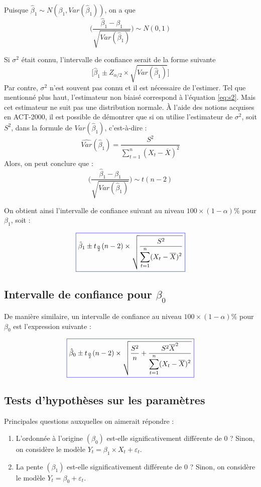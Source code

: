 \documentclass[11pt,french]{report}
\begin{document}
\bigskip
Puisque $ \hat{\beta}_1 \sim N(\beta_1, Var(\hat{\beta}_1))$, on a que 
$$
\Bigg(\frac{\hat{\beta}_1 - \beta_1}{\sqrt{Var(\hat{\beta}_1)}}\Bigg) \sim N(0,1)
$$

Si $\sigma^2$ était connu, l'intervalle de confiance serait de la forme suivante 
$$
\bigg[\hat{\beta}_1\pm Z_{\alpha/2} \times \sqrt{Var(\hat{\beta}_1)}\bigg]
$$
Par contre, $\sigma^2$ n'est  souvent pas connu et il est nécessaire de l'estimer. Tel que mentionné plus haut, l'estimateur non biaisé correspond à l'équation \ref{eq:s2}. Mais cet estimateur ne suit pas une distribution normale. À l'aide des notions acquises en ACT-2000, il est possible de démontrer que si on utilise l'estimateur de $\sigma^2$, soit $S^2$, dans la formule de $Var(\hat{\beta}_1)$, c'est-à-dire :
$$
\widehat{Var}(\hat{\beta}_1) = \frac{S^2}{\displaystyle\sum_{t=1}^n (X_t - \overline{X})^2}
$$
Alors, on peut conclure que :
$$
\Bigg(\frac{\hat{\beta}_1 - \beta_1}{\sqrt{Var(\hat{\beta}_1)}}\Bigg) \sim t(n-2)
$$

On obtient ainsi l'intervalle de confiance suivant au niveau $100 \times (1 - \alpha)\%$ pour $\beta_1$, soit :

\begin{equation}
\label{eq:intconfb1}
\color{blue}
\boxed{\color{black}
\hat{\beta}_1 \pm t_{\frac{\alpha}{2}}(n-2) \times \sqrt{\frac{S^2}{\displaystyle\sum_{t=1}^n (X_t - \overline{X})^2}}}
\end{equation}

\subsection{Intervalle de confiance pour $\beta_0$}
De manière similaire, un intervalle de confiance au niveau $100 \times (1 - \alpha)\%$ pour $\beta_0$ est l'expression suivante :

\begin{equation}
\label{eq:intconfb0}
\color{blue}
\boxed{\color{black}
\hat{\beta}_0 \pm t_{\frac{\alpha}{2}}(n-2) \times \sqrt{\frac{S^2}{n} + \frac{S^2\overline{X}^2}{\displaystyle\sum_{t=1}^n (X_t - \overline{X})^2}}}
\end{equation}

\subsection{Tests d'hypothèses sur les paramètres}
Principales questions auxquelles on aimerait répondre :
\begin{enumerate}
\item \label{hyp1} L'ordonnée à l'origine $(\beta_0)$ est-elle significativement différente de 0 ? \newline
Sinon, on considère le modèle $Y_t = \beta_1\times X_t + \varepsilon_t$.
\item  \label{hyp2} La pente $(\beta_1)$ est-elle significativement différente de 0 ? \newline
Sinon, on considère le modèle $Y_t = \beta_0 + \varepsilon_t$.
\end{enumerate}
\end{document}
